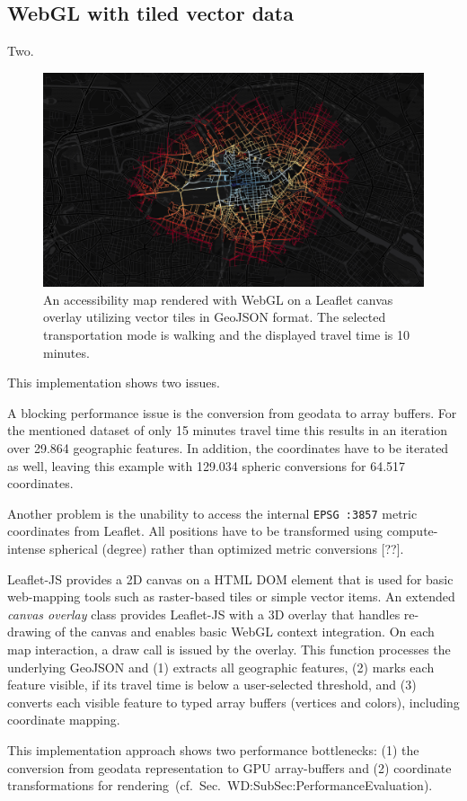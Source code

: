     \subsection{WebGL with tiled vector data}
      \label{sec:imple:applc:vectr}
      Two.
      \begin{figure}[h]
        \centering
        \includegraphics[width=0.7\linewidth]{./img/screenshot-poc2-600s-vector.png}
        \caption{An accessibility map rendered with WebGL on a Leaflet canvas overlay utilizing vector tiles in GeoJSON format. The selected transportation mode is walking and the displayed travel time is 10 minutes.}
        \label{fig:poc:two}
      \end{figure}
      This implementation shows two issues.\par
      A blocking performance issue is the conversion from geodata to array buffers. For the mentioned dataset of only 15 minutes travel time this results in an iteration over 29.864 geographic features. In addition, the coordinates have to be iterated as well, leaving this example with 129.034 spheric conversions for 64.517 coordinates.\par
      Another problem is the unability to access the internal \texttt{EPSG :3857} metric coordinates from Leaflet. All positions have to be transformed using compute-intense spherical (degree) rather than optimized metric conversions [??].\par
      Leaflet-JS provides a 2D canvas on a HTML DOM element that is used for basic
      web-mapping tools such as raster-based tiles or simple vector items. An extended
      \textsl{canvas overlay} class provides Leaflet-JS with a 3D overlay that handles
      re-drawing of the canvas and enables basic WebGL context integration. On each map
      interaction, a draw call is issued by the overlay. This function processes the
      underlying GeoJSON and (1) extracts all geographic features, (2) marks each feature
      visible, if its travel time is below a user-selected threshold, and (3) converts
      each visible feature to typed array buffers (vertices and colors), including coordinate mapping.\par
      This implementation approach shows two performance bottlenecks: (1) the conversion
      from geodata representation to GPU array-buffers and (2) coordinate transformations
      for rendering~(cf.~Sec.~{WD:SubSec:PerformanceEvaluation}). \par
